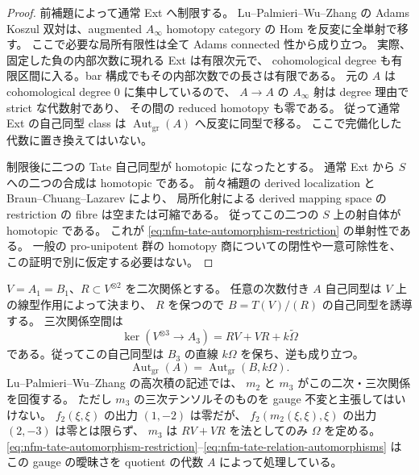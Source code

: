 \begin{proof}
前補題によって通常 Ext へ制限する。
Lu--Palmieri--Wu--Zhang\cite[Theorem~2.4 and Corollary~2.5(b)]{NFMLPWZKoszul}
の Adams Koszul 双対は、augmented $A_\infty$ homotopy category の Hom を反変に全単射で移す。
ここで必要な局所有限性は全て Adams connected 性から成り立つ。
実際、固定した負の内部次数に現れる Ext は有限次元で、
cohomological degree も有限区間に入る。bar 構成でもその内部次数での長さは有限である。
元の $A$ は cohomological degree $0$ に集中しているので、
$A\to A$ の $A_\infty$ 射は degree 理由で strict な代数射であり、
その間の reduced homotopy も零である。
従って通常 Ext の自己同型 class は $\operatorname{Aut}_{\mathrm{gr}}(A)$ へ反変に同型で移る。
ここで完備化した代数に置き換えてはいない。

制限後に二つの Tate 自己同型が homotopic になったとする。
通常 Ext から $S$ への二つの合成は homotopic である。
前々補題の derived localization と
Braun--Chuang--Lazarev\cite[Proposition~3.17 and Theorem~3.18]{NFMBCLLocalization} により、
局所化射による derived mapping space の restriction の fibre は空または可縮である。
従ってこの二つの $S$ 上の射自体が homotopic である。
これが \eqref{eq:nfm-tate-automorphism-restriction} の単射性である。
一般の pro-unipotent 群の homotopy 商についての閉性や一意可除性を、
この証明で別に仮定する必要はない。
\end{proof}

\begin{remark}
\label{rem:nfm-cubic-relations-modulo}
$V=A_1=B_1$、$R\subset V^{\otimes2}$ を二次関係とする。
任意の次数付き $A$ 自己同型は $V$ 上の線型作用によって決まり、
$R$ を保つので $B=T(V)/(R)$ の自己同型を誘導する。
三次関係空間は
\[
 \ker(V^{\otimes3}\to A_3)
   =RV+VR+k\widetilde\Omega
\]
である。従ってこの自己同型は $B_3$ の直線 $k\Omega$ を保ち、逆も成り立つ。
\begin{equation}\label{eq:nfm-tate-relation-automorphisms}
\operatorname{Aut}_{\mathrm{gr}}(A)
  =\operatorname{Aut}_{\mathrm{gr}}(B,k\Omega).
\end{equation}
Lu--Palmieri--Wu--Zhang\cite[Corollary~B]{NFMLPWZExt} の高次積の記述では、
$m_2$ と $m_3$ がこの二次・三次関係を回復する。
ただし $m_3$ の三次テンソルそのものを gauge 不変と主張してはいけない。
$f_2(\xi,\xi)$ の出力 $(1,-2)$ は零だが、
$f_2(m_2(\xi,\xi),\xi)$ の出力 $(2,-3)$ は零とは限らず、
$m_3$ は $RV+VR$ を法としてのみ $\Omega$ を定める。
\eqref{eq:nfm-tate-automorphism-restriction}--\eqref{eq:nfm-tate-relation-automorphisms} はこの gauge の曖昧さを quotient の代数 $A$ によって処理している。
\end{remark}

